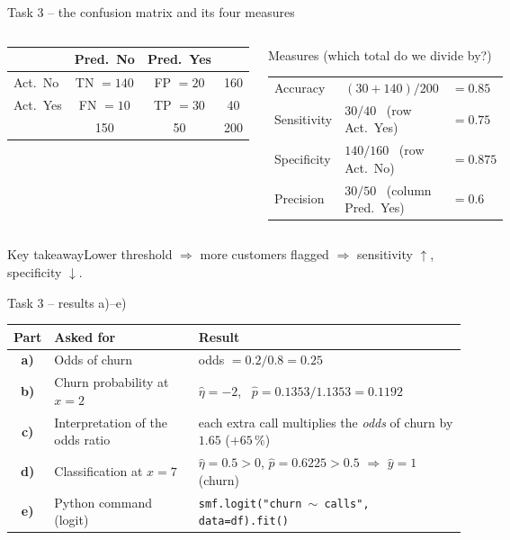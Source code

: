 \documentclass[aspectratio=169,11pt]{beamer}
\renewcommand{\textasciitilde}{\ensuremath{\sim}}
\newcommand{\kernaussage}[1]{\begin{alertblock}{Key takeaway}#1\end{alertblock}}
\begin{document}
\begin{frame}{Task 3 -- the confusion matrix and its four measures}
  \begin{columns}[c]
    \begin{center}\small
    \renewcommand{\arraystretch}{1.3}
    \begin{tabular}{l|cc|c}
      & Pred.\ No & Pred.\ Yes & \\
      \hline
      Act.\ No & \cellcolor{hsbigruen!18}TN $= 140$ & \cellcolor{hsbirot!15}FP $= 20$ & 160\\
      Act.\ Yes & \cellcolor{hsbirot!15}FN $= 10$ & \cellcolor{hsbigruen!18}TP $= 30$ & 40\\
      \hline
      & 150 & 50 & 200
    \end{tabular}
    \end{center}
    \begin{block}{Measures (which total do we divide by?)}
      \renewcommand{\arraystretch}{1.3}
      \begin{tabular}{@{}lll@{}}
        Accuracy & $(30+140)/200$ & $= 0.85$\\
        Sensitivity & $30/40$ \ (row Act.\ Yes) & $= 0.75$\\
        Specificity & $140/160$ \ (row Act.\ No) & $= 0.875$\\
        Precision & $30/50$ \ (column Pred.\ Yes) & $= 0.6$
      \end{tabular}
    \end{block}
  \end{columns}
  \medskip
  \kernaussage{Lower threshold $\Rightarrow$ more customers flagged $\Rightarrow$ sensitivity $\uparrow$, specificity $\downarrow$.}
\end{frame}

\begin{frame}{Task 3 -- results a)--e)}
  \begin{center}\small
  \renewcommand{\arraystretch}{1.35}
  \begin{tabular}{@{}c>{\raggedright\arraybackslash}p{4.9cm}>{\raggedright\arraybackslash}p{8.4cm}@{}}
    \toprule Part & Asked for & Result\\ \midrule
    \textbf{a)} & Odds of churn & odds $= 0.2/0.8 = 0.25$\\
    \textbf{b)} & Churn probability at $x = 2$ & $\hat\eta = -2$, \ $\hat p = 0.1353/1.1353 = 0.1192$\\
    \textbf{c)} & Interpretation of the odds ratio & each extra call multiplies the \emph{odds} of churn by $1.65$ ($+65\,\%$)\\
    \textbf{d)} & Classification at $x = 7$ & $\hat\eta = 0.5 > 0$, $\hat p = 0.6225 > 0.5$ $\Rightarrow$ $\hat y = 1$ (churn)\\
    \textbf{e)} & Python command (logit) & \texttt{smf.logit("churn \textasciitilde{} calls", data=df).fit()}\\
    \bottomrule
  \end{tabular}
  \end{center}
\end{frame}
\end{document}
